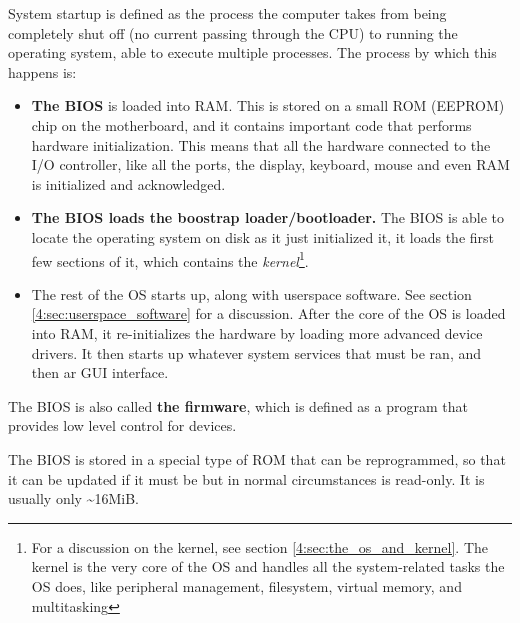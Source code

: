 \documentclass[../main.tex]{subfiles}
\begin{document}
System startup is defined as the process the computer takes from being completely shut off (no current passing through the CPU) to running the operating system, able to execute multiple processes. The process by which this happens is:

\begin{itemize}
    \item \textbf{The BIOS} is loaded into RAM. This is stored on a small ROM (EEPROM) chip on the motherboard, and it contains important code that performs hardware initialization. This means that all the hardware connected to the I/O controller, like all the ports, the display, keyboard, mouse and even RAM is initialized and acknowledged.
    \item \textbf{The BIOS loads the boostrap loader/bootloader.} The BIOS is able to locate the operating system on disk as it just initialized it, it loads the first few sections of it, which contains the \emph{kernel}\footnote{For a discussion on the kernel, see section \ref{4:sec:the_os_and_kernel}. The kernel is the very core of the OS and handles all the system-related tasks the OS does, like peripheral management, filesystem, virtual memory, and multitasking}.
    \item The rest of the OS starts up, along with userspace software. See section \ref{4:sec:userspace_software} for a discussion. After the core of the OS is loaded into RAM, it re-initializes the hardware by loading more advanced device drivers. It then starts up whatever system services that must be ran, and then ar GUI interface.
\end{itemize}

The BIOS is also called \textbf{the firmware}, which is defined as a program that provides low level control for devices.

The BIOS is stored in a special type of ROM that can be reprogrammed, so that it can be updated if it must be but in normal circumstances is read-only. It is usually only \textasciitilde16MiB.
\end{document}

